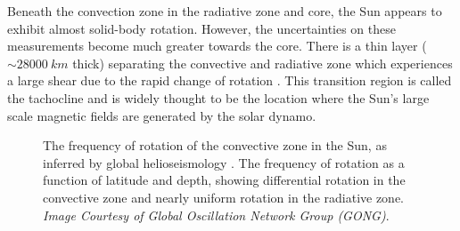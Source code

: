 \documentclass[11pt,a4paper,onecolumn]{report}
\begin{document}
Beneath the convection zone in the radiative zone and core, the Sun appears to
exhibit almost solid-body rotation. However, the uncertainties on these
measurements become much greater towards the core. There is a thin layer
(\(\sim \SI{28000}{km}\) thick) separating the convective and radiative zone which
experiences a large shear due to the rapid change of rotation
\citep{spiegel1992}. This transition region is called the tachocline and is
widely thought to be the location where the Sun's large scale magnetic fields are
generated by the solar dynamo.

\begin{figure}[t]%
  \centering
  \qquad
  \caption[]{ The frequency of rotation of the
    convective zone in the Sun, as inferred by global helioseismology
    \citep{thompson_helioseismology_2004}.  The
    frequency of rotation as a function of latitude and depth, showing differential
    rotation in the convective zone and nearly uniform rotation in the radiative
    zone. \textit{Image Courtesy of Global Oscillation Network Group
    (GONG)\footnotemark }.}
  \label{fig:solar_rotation}
\end{figure}
\end{document}
